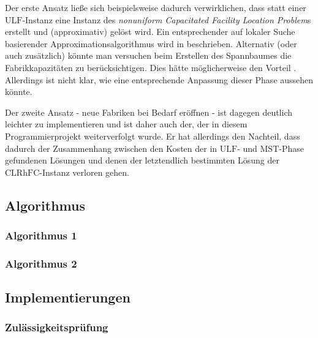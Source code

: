 \documentclass[a4paper,ngerman,12pt,bibtotoc]{scrartcl}
\theoremstyle{definition}
\theoremstyle{plain}
\theoremstyle{remark}
\newcommand{\CLRHFC}{\mathrm{CLRhFC}}
\newcommand{\MST}{\mathrm{MST}}
\newcommand{\ULF}{\mathrm{ULF}}
\begin{document}
	Der erste Ansatz ließe sich beispielsweise dadurch verwirklichen, dass statt einer $\ULF$-Instanz eine Instanz des \emph{nonuniform Capacitated Facility Location Problem}s erstellt und (approximativ) gelöst wird. Ein entsprechender auf lokaler Suche basierender Approximationsalgorithmus wird in \cite{Pal01facilitylocation} beschrieben. Alternativ (oder auch zusätzlich) könnte man versuchen beim Erstellen des Spannbaumes die Fabrikkapazitäten zu berücksichtigen. Dies hätte möglicherweise den Vorteil . Allerdings ist nicht klar, wie eine entsprechende Anpassung dieser Phase aussehen könnte.
	
	Der zweite Ansatz - neue Fabriken bei Bedarf eröffnen - ist dagegen deutlich leichter zu implementieren und ist daher auch der, der in diesem Programmierprojekt weiterverfolgt wurde. Er hat allerdings den Nachteil, dass dadurch der Zusammenhang zwischen den Kosten der in $\ULF$- und $\MST$-Phase gefundenen Lösungen und denen der letztendlich bestimmten Lösung der $\CLRHFC$-Instanz verloren gehen. 

	\subsection{Algorithmus}
	

	\subsubsection{Algorithmus 1}
	
	\subsubsection{Algorithmus 2}
	

	\subsection{Implementierungen}
	
	\subsubsection{Zulässigkeitsprüfung}
	
\end{document}
